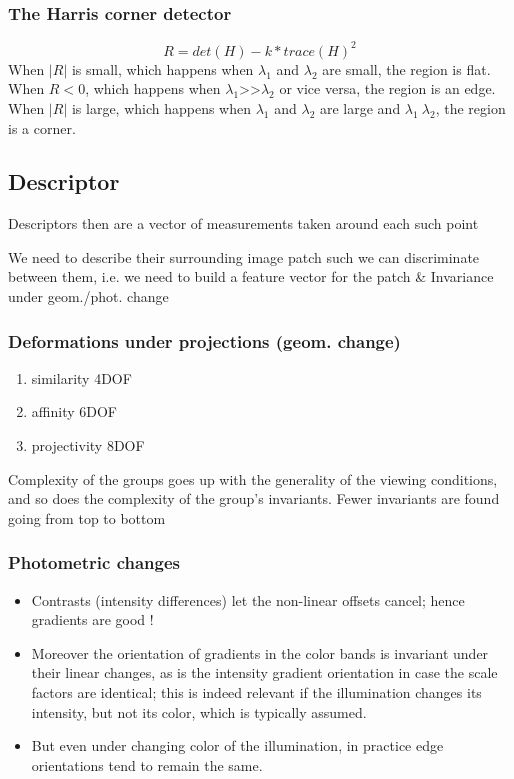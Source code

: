 \subsubsection{The Harris corner detector}
$$ R = det(H) - k*trace(H)^2 $$
When $|R|$ is small, which happens when $\lambda_1$ and $\lambda_2$ are small, the region is flat.\\
When $R<0$, which happens when $\lambda_1$>>$\lambda_2$ or vice versa, the region is an edge.\\
When $|R|$ is large, which happens when $\lambda_1$ and $\lambda_2$ are large and $\lambda_1 ~\lambda_2$, the region is a corner.

\subsection{Descriptor}
Descriptors then are a vector of measurements taken around each such point


We need to describe their surrounding image patch such we can discriminate between them, i.e. we need to build a feature vector for the patch \&
Invariance under geom./phot. change

\subsubsection{Deformations under projections (geom. change)}
\begin{enumerate}
	\item similarity 4DOF
	\item affinity 6DOF
	\item projectivity 8DOF
\end{enumerate}

Complexity of the groups goes up with the generality of the viewing conditions, and so does the complexity of the group’s invariants. Fewer invariants are found going from top to bottom

\subsubsection{Photometric changes}
\begin{itemize}
	\item Contrasts (intensity differences) let the non-linear offsets cancel; hence gradients are good !
	\item Moreover the orientation of gradients in the color bands is invariant under their linear changes, as is the intensity gradient orientation in case the scale factors are identical; this is indeed relevant if the illumination changes its intensity, but not its color, which is typically assumed.
	\item But even under changing color of the illumination, in practice edge orientations tend to remain the same.
\end{itemize}

